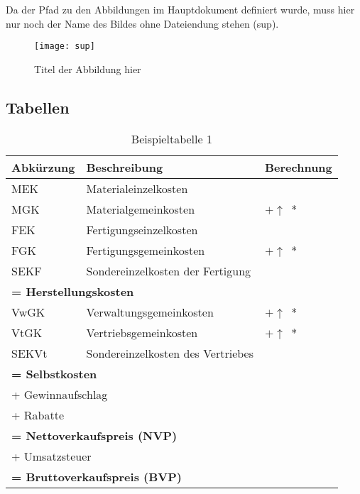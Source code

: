 Da der Pfad zu den Abbildungen im Hauptdokument definiert wurde, muss hier nur noch der Name des Bildes ohne Dateiendung stehen (sup).

\begin{figure}[H]
\begin{center}
\texttt{[image: sup]}
\caption{Titel der Abbildung hier}
\end{center}
\end{figure}

\subsection{Tabellen}
\begin{table}[H]
\centering
\begin{tabularx}{\textwidth}[ht]{|l|X|l|}
  \hline
  \textbf{Abkürzung} & \textbf{Beschreibung} & \textbf{Berechnung}\\
  \hline\hline
    MEK & Materialeinzelkosten & \\
  	MGK & Materialgemeinkosten & $+ \uparrow$~*\\
    FEK & Fertigungseinzelkosten & \\
  	FGK & Fertigungsgemeinkosten & $+ \uparrow$~*\\
	SEKF & Sondereinzelkosten der Fertigung & \\
	\hline\hline
	\multicolumn{3}{|l|}{\textbf{= Herstellungskosten}} \\
	\hline\hline
  	VwGK & Verwaltungsgemeinkosten & $+ \uparrow$~*\\
  	VtGK & Vertriebsgemeinkosten & $+ \uparrow$~*\\
  	SEKVt & Sondereinzelkosten des Vertriebes & \\
	\hline\hline
	\multicolumn{3}{|l|}{\textbf{= Selbstkosten}} \\
	\hline\hline
	\multicolumn{3}{|l|}{+ Gewinnaufschlag} \\
	\multicolumn{3}{|l|}{+ Rabatte} \\
	\hline\hline
	\multicolumn{3}{|l|}{\textbf{= Nettoverkaufspreis (NVP)}} \\
	\hline
	\multicolumn{3}{|l|}{+ Umsatzsteuer} \\
	\hline\hline
	\multicolumn{3}{|l|}{\textbf{= Bruttoverkaufspreis (BVP)}} \\
	\hline
\end{tabularx} \\
		\caption{Beispieltabelle 1}
		\label{tbl:beispieltabelle2}
\end{table}

